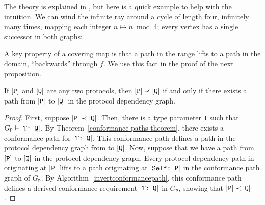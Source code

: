 \documentclass[../generics]{subfiles}
\begin{document}
The theory is explained in \cite{godsil2001algebraic}, but here is a quick example to help with the intuition. We can wind the infinite ray around a cycle of length four, infinitely many times, mapping each integer $n\mapsto n \bmod 4$; every vertex has a single successor in both graphs:
\begin{center}
\end{center}
A key property of a covering map is that a path in the range lifts to a path in the domain, ``backwards'' through $f$. We use this fact in the proof of the next proposition.

\begin{proposition}
If $[\texttt{P}]$ and $[\texttt{Q}]$ are any two protocols, then $[\texttt{P}]\prec[\texttt{Q}]$ if and only if there exists a path from $[\texttt{P}]$ to $[\texttt{Q}]$ in the protocol dependency graph.
\end{proposition}
\begin{proof}
First, suppose $[\texttt{P}]\prec[\texttt{Q}]$. Then, there is a type parameter \texttt{T} such that $G_\texttt{P}\vDash[\texttt{T:~Q}]$. By Theorem~\ref{conformance paths theorem}, there exists a conformance path for $[\texttt{T:~Q}]$. This conformance path defines a path in the protocol dependency graph from  to $[\texttt{Q}]$. Now, suppose that we have a path from $[\texttt{P}]$ to $[\texttt{Q}]$ in the protocol dependency graph. Every protocol dependency path in originating at $[\texttt{P}]$ lifts to a path originating at $[\texttt{Self:~P}]$ in the conformance path graph of $G_\texttt{P}$. By Algorithm~\ref{invertconformancepath}, this conformance path defines a derived conformance requirement $[\texttt{T:~Q}]$ in $G_\texttt{P}$, showing that $[\texttt{P}]\prec[\texttt{Q}]$.
\end{proof}
\end{document}
